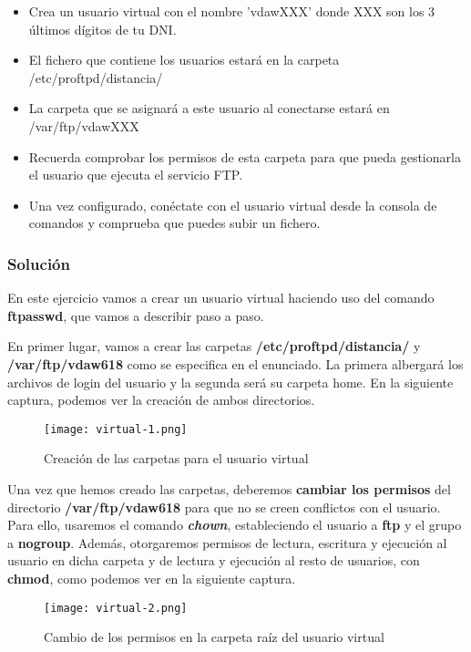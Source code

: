 \begin{itemize}
    \item Crea un usuario virtual con el nombre 'vdawXXX' donde XXX son los 3 últimos dígitos de tu DNI.
    \item El fichero que contiene los usuarios estará en la carpeta /etc/proftpd/distancia/
    \item La carpeta que se asignará a este usuario al conectarse estará en /var/ftp/vdawXXX
    \item Recuerda comprobar los permisos de esta carpeta para que pueda gestionarla el usuario que ejecuta el servicio FTP.
    \item Una vez configurado, conéctate con el usuario virtual desde la consola de comandos y comprueba que puedes subir un fichero.
\end{itemize}

\subsubsection{Solución}
En este ejercicio vamos a crear un usuario virtual haciendo uso del comando \textbf{ftpasswd}, que vamos a describir paso a paso.

En primer lugar, vamos a crear las carpetas \textbf{/etc/proftpd/distancia/} y \textbf{/var/ftp/vdaw618} como se especifica en el enunciado. La primera albergará los archivos de login del usuario y la segunda será su carpeta home.  En la siguiente captura, podemos ver la creación de ambos directorios.

\begin{figure}[H]
    \centering
    \texttt{[image: virtual-1.png]}
    \caption{Creación de las carpetas para el usuario virtual}
\end{figure}

Una vez que hemos creado las carpetas, deberemos\textbf{ cambiar los permisos} del directorio \textbf{/var/ftp/vdaw618} para que no se creen conflictos con el usuario. Para ello, usaremos el comando \textit{\textbf{chown}}, estableciendo el usuario a \textbf{ftp} y el grupo a \textbf{nogroup}. Además, otorgaremos permisos de lectura, escritura y ejecución al usuario en dicha carpeta y de lectura y ejecución al resto de usuarios, con \textbf{chmod}, como podemos ver en la siguiente captura.
\begin{figure}[H]
    \centering
    \texttt{[image: virtual-2.png]}
    \caption{Cambio de los permisos en la carpeta raíz del usuario virtual}
\end{figure}


